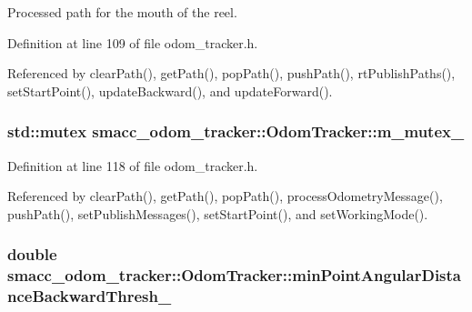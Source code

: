 Processed path for the mouth of the reel. 



Definition at line 109 of file odom\+\_\+tracker.\+h.



Referenced by clear\+Path(), get\+Path(), pop\+Path(), push\+Path(), rt\+Publish\+Paths(), set\+Start\+Point(), update\+Backward(), and update\+Forward().

\subsubsection[{\texorpdfstring{m\+\_\+mutex\+\_\+}{m_mutex_}}]{\setlength{\rightskip}{0pt plus 5cm}std\+::mutex smacc\+\_\+odom\+\_\+tracker\+::\+Odom\+Tracker\+::m\+\_\+mutex\+\_\+\hspace{0.3cm}{\ttfamily [protected]}}\hypertarget{classsmacc__odom__tracker_1_1OdomTracker_ad65e52bfd236e073940808c35f2bed8c}{}\label{classsmacc__odom__tracker_1_1OdomTracker_ad65e52bfd236e073940808c35f2bed8c}


Definition at line 118 of file odom\+\_\+tracker.\+h.



Referenced by clear\+Path(), get\+Path(), pop\+Path(), process\+Odometry\+Message(), push\+Path(), set\+Publish\+Messages(), set\+Start\+Point(), and set\+Working\+Mode().

\subsubsection[{\texorpdfstring{min\+Point\+Angular\+Distance\+Backward\+Thresh\+\_\+}{minPointAngularDistanceBackwardThresh_}}]{\setlength{\rightskip}{0pt plus 5cm}double smacc\+\_\+odom\+\_\+tracker\+::\+Odom\+Tracker\+::min\+Point\+Angular\+Distance\+Backward\+Thresh\+\_\+\hspace{0.3cm}{\ttfamily [protected]}}\hypertarget{classsmacc__odom__tracker_1_1OdomTracker_ac7cac171a63c8981f8233f71c94d0776}{}\label{classsmacc__odom__tracker_1_1OdomTracker_ac7cac171a63c8981f8233f71c94d0776}


